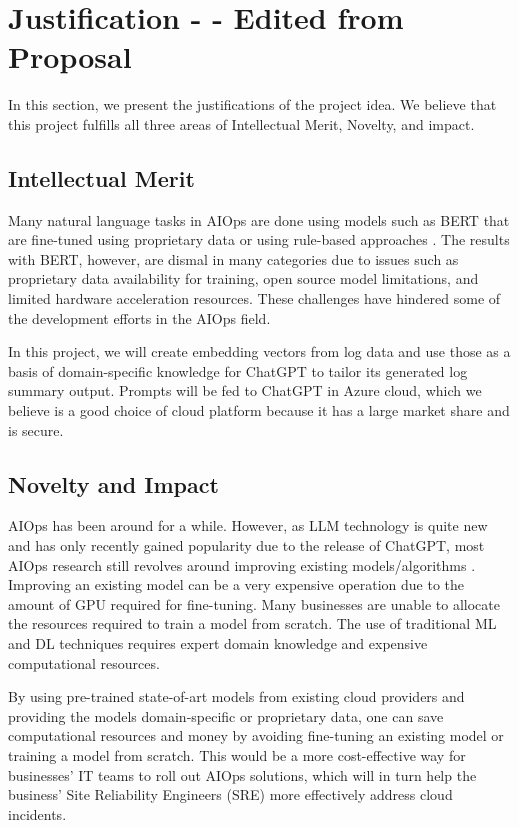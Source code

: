 \documentclass[conference]{IEEEtran}
\begin{document}
\section{Justification - - Edited from Proposal}
In this section, we present the justifications of the project idea. We believe that this project fulfills all three areas of Intellectual Merit, Novelty, and impact.

\subsection{Intellectual Merit}
Many natural language tasks in AIOps are done using models such as BERT \cite{network-log-anomaly-detection} that are fine-tuned using proprietary data or using rule-based approaches \cite{logrule}. The results with BERT, however, are dismal \cite{network-log-anomaly-detection} in many categories due to issues such as proprietary data availability for training, open source model limitations, and limited hardware acceleration resources. These challenges have hindered some of the development efforts in the AIOps field.

In this project, we will create embedding vectors from log data and use those as a basis of domain-specific knowledge for ChatGPT to tailor its generated log summary output. Prompts will be fed to ChatGPT in Azure cloud, which we believe is a good choice of cloud platform because it has a large market share and is secure.

\subsection{Novelty and Impact}
AIOps has been around for a while. However, as LLM technology is quite new and has only recently gained popularity due to the release of ChatGPT, most AIOps research still revolves around improving existing models/algorithms \cite{network-log-anomaly-detection}. Improving an existing model can be a very expensive operation due to the amount of GPU required for fine-tuning. Many businesses are unable to allocate the resources required to train a model from scratch. The use of traditional ML and DL techniques requires expert domain knowledge and expensive computational resources.

By using pre-trained state-of-art models from existing cloud providers and providing the models domain-specific or proprietary data, one can save computational resources and money by avoiding fine-tuning an existing model or training a model from scratch. This would be a more cost-effective way for businesses' IT teams to roll out AIOps solutions, which will in turn help the business' Site Reliability Engineers (SRE) more effectively address cloud incidents.
\end{document}
